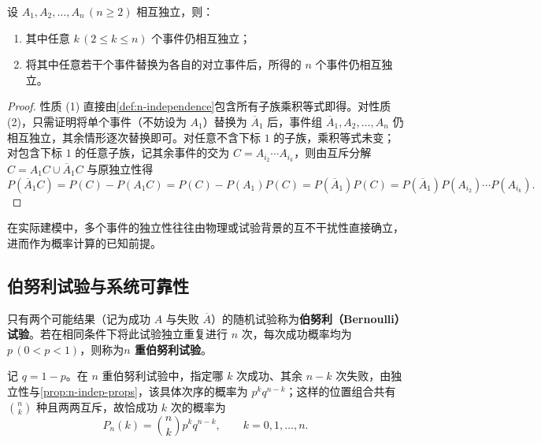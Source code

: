 \begin{proposition}[多事件独立的子族与取补性质]
\label{prop:n-indep-props}
设 $A_1,A_2,\ldots,A_n\,(n\ge 2)$ 相互独立，则：
\begin{enumerate}
  \item 其中任意 $k\,(2\le k\le n)$ 个事件仍相互独立；
  \item 将其中任意若干个事件替换为各自的对立事件后，所得的 $n$ 个事件仍相互独立。
\end{enumerate}
\end{proposition}
\begin{proof}
性质 (1) 直接由\cref{def:n-independence}包含所有子族乘积等式即得。对性质 (2)，只需证明将单个事件（不妨设为 $A_1$）替换为 $\overline{A}_1$ 后，事件组 $\overline{A}_1,A_2,\ldots,A_n$ 仍相互独立，其余情形逐次替换即可。对任意不含下标 $1$ 的子族，乘积等式未变；对包含下标 $1$ 的任意子族，记其余事件的交为 $C=A_{i_2}\cdots A_{i_k}$，则由互斥分解 $C=A_1C\cup\overline{A}_1C$ 与原独立性得
\[
  P(\overline{A}_1C)=P(C)-P(A_1C)=P(C)-P(A_1)P(C)
  =P(\overline{A}_1)P(C)
  =P(\overline{A}_1)P(A_{i_2})\cdots P(A_{i_k}).
\]
\end{proof}

在实际建模中，多个事件的独立性往往由物理或试验背景的互不干扰性直接确立，进而作为概率计算的已知前提。

\subsection{伯努利试验与系统可靠性}

\begin{definition}
\label{def:bernoulli-trials}
只有两个可能结果（记为成功 $A$ 与失败 $\overline{A}$）的随机试验称为\textbf{伯努利（Bernoulli）试验}。若在相同条件下将此试验独立重复进行 $n$ 次，每次成功概率均为 $p\,(0<p<1)$，则称为\textbf{$n$ 重伯努利试验}。
\end{definition}

记 $q=1-p$。在 $n$ 重伯努利试验中，指定哪 $k$ 次成功、其余 $n-k$ 次失败，由独立性与\cref{prop:n-indep-props}，该具体次序的概率为 $p^k q^{n-k}$；这样的位置组合共有 $\binom{n}{k}$ 种且两两互斥，故恰成功 $k$ 次的概率为
\begin{equation}
  P_n(k)=\binom{n}{k}p^k q^{n-k},\qquad k=0,1,\ldots,n.
  \label{eq:bernoulli-count}
\end{equation}

